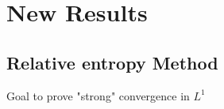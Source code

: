 \chapter{New Results}
\section{Relative entropy Method}
Goal to prove "strong" convergence in $L^{1} $
